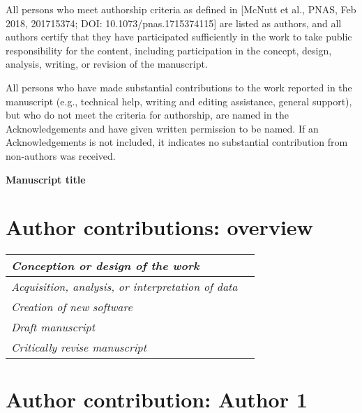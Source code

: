 \documentclass[10pt]{article}
\begin{document}
All persons who meet authorship criteria as defined in
[McNutt et al., PNAS, Feb 2018, 201715374; DOI: 10.1073/pnas.1715374115]
are listed as authors, and all authors certify that they have participated
sufficiently in the work to take public responsibility for the content,
including participation in the concept, design, analysis, writing, or
revision of the manuscript. 

All persons who have made substantial contributions to the work reported
in the manuscript (e.g., technical help, writing and editing assistance,
general support), but who do not meet the criteria for authorship, are named
in the Acknowledgements and have given written permission to be
named. If an Acknowledgements is not included, it indicates no substantial
contribution from non-authors was received.

\bigskip

\begin{center}
 \textbf{Manuscript title}
\end{center}

\section*{Author contributions: overview}
\vspace{1mm}
\begin{center}
 \begin{tabular}{l|l}
  \textit{Conception or design of the work} & \\\hline
  \textit{Acquisition, analysis, or interpretation of data} & \\\hline
  \textit{Creation of new software} & \\\hline
  \textit{Draft manuscript} & \\\hline
  \textit{Critically revise manuscript} &
 \end{tabular}
\end{center}

\section*{Author contribution: Author 1}
\end{document}
